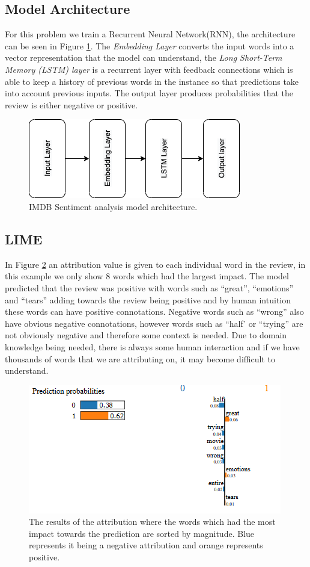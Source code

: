 \subsection{Model Architecture}
For this problem we train a Recurrent Neural Network(RNN), the architecture can be seen in Figure \ref{fig:imdb-architecture}. The \emph{Embedding Layer} converts the input words into a vector representation that the model can understand, the \emph{Long Short-Term Memory (LSTM) layer} is a recurrent layer with feedback connections which is able to keep a history of previous words in the instance so that predictions take into account previous inputs. The output layer produces probabilities that the review is either negative or positive.
\begin  {figure}[!htpb]
\centering
  \includegraphics[width=0.5\linewidth]{Evaluation_Images/IMDB_Architecture.png}
   \caption{IMDB Sentiment analysis model architecture.}
    \label{fig:imdb-architecture}
\end{figure}
\subsection{LIME}
In Figure \ref{fig:lime-imdb} an attribution value is given to each individual word in the review, in this example we only show 8 words which had the largest impact. The model predicted that the review was positive with words such as ``great'', ``emotions'' and ``tears'' adding towards the review being positive and by human intuition these words can have positive connotations. Negative words such as ``wrong'' also have obvious negative connotations, however words such as ``half' or ``trying'' are not obviously negative and therefore some context is needed. Due to domain knowledge being needed, there is always some human interaction and if we have thousands of words that we are attributing on, it may become difficult to understand.
\begin  {figure}[!htpb]
  \includegraphics[width=0.75\linewidth]{Evaluation_Images/IMDB_explanation.png}
  \caption{The results of the attribution where the words which had the most impact towards the prediction are sorted by magnitude. Blue represents it being a negative attribution and orange represents positive.}
  \label{fig:lime-imdb}
\end{figure}


